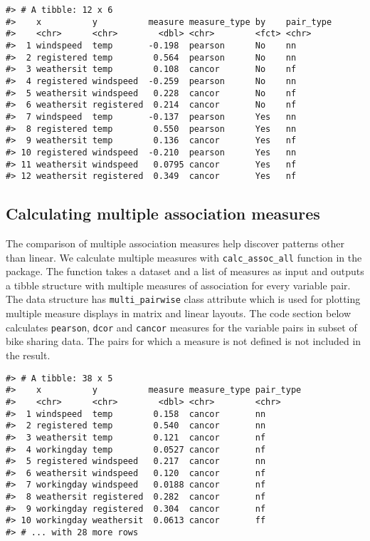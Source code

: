 \begin{verbatim}
#> # A tibble: 12 x 6
#>    x          y          measure measure_type by    pair_type
#>    <chr>      <chr>        <dbl> <chr>        <fct> <chr>    
#>  1 windspeed  temp       -0.198  pearson      No    nn       
#>  2 registered temp        0.564  pearson      No    nn       
#>  3 weathersit temp        0.108  cancor       No    nf       
#>  4 registered windspeed  -0.259  pearson      No    nn       
#>  5 weathersit windspeed   0.228  cancor       No    nf       
#>  6 weathersit registered  0.214  cancor       No    nf       
#>  7 windspeed  temp       -0.137  pearson      Yes   nn       
#>  8 registered temp        0.550  pearson      Yes   nn       
#>  9 weathersit temp        0.136  cancor       Yes   nf       
#> 10 registered windspeed  -0.210  pearson      Yes   nn       
#> 11 weathersit windspeed   0.0795 cancor       Yes   nf       
#> 12 weathersit registered  0.349  cancor       Yes   nf
\end{verbatim}

\hypertarget{calculating-multiple-association-measures}{%
\subsection{Calculating multiple association measures}\label{calculating-multiple-association-measures}}

The comparison of multiple association measures help discover patterns other than linear. We calculate multiple measures with \texttt{calc\_assoc\_all} function in the package. The function takes a dataset and a list of measures as input and outputs a tibble structure with multiple measures of association for every variable pair. The data structure has \texttt{multi\_pairwise} class attribute which is used for plotting multiple measure displays in matrix and linear layouts. The code section below calculates \texttt{pearson}, \texttt{dcor} and \texttt{cancor} measures for the variable pairs in subset of bike sharing data. The pairs for which a measure is not defined is not included in the result.

\begin{verbatim}
#> # A tibble: 38 x 5
#>    x          y          measure measure_type pair_type
#>    <chr>      <chr>        <dbl> <chr>        <chr>    
#>  1 windspeed  temp        0.158  cancor       nn       
#>  2 registered temp        0.540  cancor       nn       
#>  3 weathersit temp        0.121  cancor       nf       
#>  4 workingday temp        0.0527 cancor       nf       
#>  5 registered windspeed   0.217  cancor       nn       
#>  6 weathersit windspeed   0.120  cancor       nf       
#>  7 workingday windspeed   0.0188 cancor       nf       
#>  8 weathersit registered  0.282  cancor       nf       
#>  9 workingday registered  0.304  cancor       nf       
#> 10 workingday weathersit  0.0613 cancor       ff       
#> # ... with 28 more rows
\end{verbatim}

